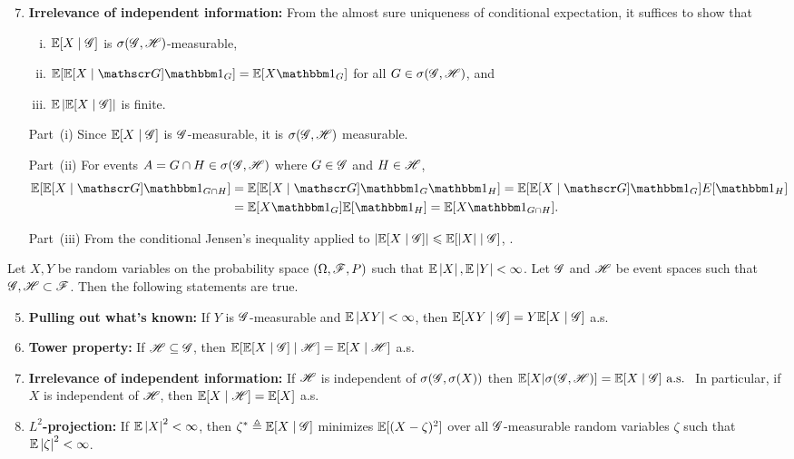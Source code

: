 \documentclass[12pt,aspectratio=169]{beamer}
\begin{document}
\begin{frame}
\begin{Proof}
\begin{enumerate}
\setcounter{enumi}{6}
\item \textbf{Irrelevance of independent information:} 
From the almost sure uniqueness of conditional expectation, 
it suffices to show that 
\begin{enumerate}[(i)]
\item $\mathbb{E}[X\mid\mathscr{G}]$ is $\sigma(\mathscr{G},\mathscr{H})$-measurable, 
\item $\E[\E[X\mid\sG]\Ind{G}] = \E[X\Ind{G}]$ for all $G\in\sigma(\mathscr{G},\mathscr{H})$, and 
\item $\mathbb{E}\left\lvert\mathbb{E}[X\mid\mathscr{G}]\right\rvert$ is finite.  
\end{enumerate}

Part~(i) Since $\mathbb{E}[X\mid\mathscr{G}]$ is $\mathscr{G}$-measurable, it is $\sigma(\mathscr{G},\mathscr{H})$ measurable. 


Part~(ii) For events $A = G \cap H \in \sigma(\mathscr{G},\mathscr{H})$ 
where $G \in \mathscr{G}$ and $H \in \mathscr{H}$,  
\begin{align*}  
\E[\E[X\mid\sG]\Ind{G\cap H}] 
& = \E[\E[X\mid\sG]\Ind{G}\Ind{H}] 
= \E[\E[X\mid\sG]\Ind{G}]E[\Ind{H}] \\
& = \E[X\Ind{G}]\E[\Ind{H}] = \E[X\Ind{G\cap H}]. 
\end{align*}

Part~(iii) From the conditional Jensen's inequality applied to $\left\lvert\mathbb{E}[X\mid\mathscr{G}]\right\rvert \leqslant \mathbb{E}[\left\lvert X\right\rvert\mid\mathscr{G}]$,  
. 
\end{enumerate}
\end{Proof}
\end{frame}


\begin{frame}
\begin{prop} 
Let $X,Y$ be random variables on the probability space $(\Omega, \mathscr{F}, P)$ such that $\mathbb{E}\left\lvert X\right\rvert , \mathbb{E}\left\lvert Y\right\rvert < \infty$. 
Let $\mathscr{G}$ and $\mathscr{H}$ be event spaces such that $\mathscr{G}, \mathscr{H} \subset \mathscr{F}$. 
Then the following statements are true. 
\begin{enumerate}
\setcounter{enumi}{4}
\item \textbf{Pulling out what's known:} If $Y$ is $\mathscr{G}$-measurable and $\mathbb{E}\left\lvert XY\right\rvert <\infty$, then
$\mathbb{E}[XY\mid \mathscr{G}] = Y\mathbb{E}[X\mid\mathscr{G}]$ a.s.
\item \textbf{Tower property:} If $\mathscr{H} \subseteq \mathscr{G}$, then
$\mathbb{E}[\mathbb{E}[X\mid\mathscr{G}]\mid \mathscr{H}] = \mathbb{E}[X\mid \mathscr{H}]$ a.s.
\item \textbf{Irrelevance of independent information:} If $\mathscr{H}$ is independent of $\sigma (\mathscr{G}, \sigma (X))$
then
$\mathbb{E}[X|\sigma (\mathscr{G}, \mathscr{H})] = \mathbb{E}[X\mid\mathscr{G}] \text{ a.s. }$
In particular, if $X$ is independent of $\mathscr{H}$, then $\mathbb{E}[X\mid \mathscr{H}] = \mathbb{E}[X]$ a.s.
\item \textbf{$L^2$-projection:} If $\mathbb{E}\left\lvert X\right\rvert^2 < \infty$, then $\zeta^\ast \triangleq \mathbb{E}[X\mid\mathscr{G}]$ minimizes $\mathbb{E}[(X - \zeta)^2]$
over all $\mathscr{G}$-measurable random variables $\zeta$ such that $\mathbb{E}\left\lvert\zeta\right\rvert^2 < \infty$. 
\end{enumerate}
\end{prop}
\end{frame}
\end{document}
